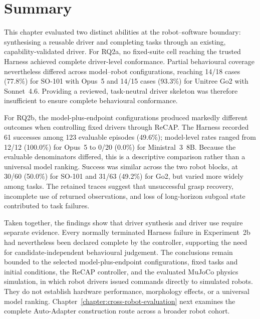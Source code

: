 \section{Summary}

This chapter evaluated two distinct abilities at the robot--software boundary:
synthesising a reusable driver and completing tasks through an existing,
capability-validated driver. For RQ2a, no fixed-suite cell reaching the trusted
Harness achieved complete driver-level conformance. Partial behavioural
coverage nevertheless differed across model--robot configurations, reaching
14/18 cases (77.8\%) for SO-101 with Opus~5 and 14/15 cases (93.3\%) for
Unitree Go2 with Sonnet~4.6. Providing a reviewed, task-neutral driver skeleton
was therefore insufficient to ensure complete behavioural conformance.

For RQ2b, the model-plus-endpoint configurations produced markedly different
outcomes when controlling fixed drivers through ReCAP. The Harness recorded 61
successes among 123 evaluable episodes (49.6\%); model-level rates ranged from
12/12 (100.0\%) for Opus~5 to 0/20 (0.0\%) for Ministral~3~8B. Because the
evaluable denominators differed, this is a descriptive comparison rather than
a universal model ranking. Success was similar across the two robot blocks, at
30/60 (50.0\%) for SO-101 and 31/63 (49.2\%) for Go2, but varied more widely
among tasks. The retained traces suggest that unsuccessful grasp recovery,
incomplete use of returned observations, and loss of long-horizon subgoal
state contributed to task failures.

Taken together, the findings show that driver synthesis and driver use require
separate evidence. Every normally terminated Harness failure in
Experiment~2b had nevertheless been declared complete by the controller,
supporting the need for candidate-independent behavioural judgement. The
conclusions remain bounded to the selected model-plus-endpoint configurations,
fixed tasks and initial conditions, the ReCAP controller, and the evaluated
MuJoCo physics simulation, in which robot drivers issued commands directly to
simulated robots. They do not establish hardware performance, morphology
effects, or a universal model ranking.
Chapter~\ref{chapter:cross-robot-evaluation} next examines the complete
Auto-Adapter construction route across a broader robot cohort.
